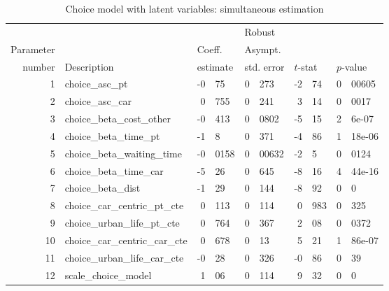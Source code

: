 \documentclass[12pt,a4paper]{article}
\begin{document}
\begin{table}[htb]
  \footnotesize
  \begin{center}
\begin{tabular}{rlr@{.}lr@{.}lr@{.}lr@{.}l}
          &              &   \multicolumn{2}{l}{}         & \multicolumn{2}{l}{Robust}  &  \multicolumn{4}{l}{}  \\
Parameter &              &   \multicolumn{2}{l}{Coeff.}   & \multicolumn{2}{l}{Asympt.}       & \multicolumn{4}{l}{}   \\
number    &  Description &   \multicolumn{2}{l}{estimate} & \multicolumn{2}{l}{std. error}    & \multicolumn{2}{l}{$t$-stat}  &  \multicolumn{2}{l}{$p$-value} \\
\hline
1 & choice\_asc\_pt & -0&75 & 0&273 & -2&74 & 0&00605 \\ 
2 & choice\_asc\_car & 0&755 & 0&241 & 3&14 & 0&0017 \\ 
3 & choice\_beta\_cost\_other & -0&413 & 0&0802 & -5&15 & 2&6e-07 \\ 
4 & choice\_beta\_time\_pt & -1&8 & 0&371 & -4&86 & 1&18e-06 \\ 
5 & choice\_beta\_waiting\_time & -0&0158 & 0&00632 & -2&5 & 0&0124 \\ 
6 & choice\_beta\_time\_car & -5&26 & 0&645 & -8&16 & 4&44e-16 \\ 
7 & choice\_beta\_dist & -1&29 & 0&144 & -8&92 & 0&0 \\ 
8 & choice\_car\_centric\_pt\_cte & 0&113 & 0&114 & 0&983 & 0&325 \\ 
9 & choice\_urban\_life\_pt\_cte & 0&764 & 0&367 & 2&08 & 0&0372 \\ 
10 & choice\_car\_centric\_car\_cte & 0&678 & 0&13 & 5&21 & 1&86e-07 \\ 
11 & choice\_urban\_life\_car\_cte & -0&28 & 0&326 & -0&86 & 0&39 \\ 
12 & scale\_choice\_model & 1&06 & 0&114 & 9&32 & 0&0 \\ 
\end{tabular}
  \end{center}
  \caption{Choice model with latent variables: simultaneous estimation\label{tab:choice_simultaneous}}
\end{table}

\clearpage
\end{document}
